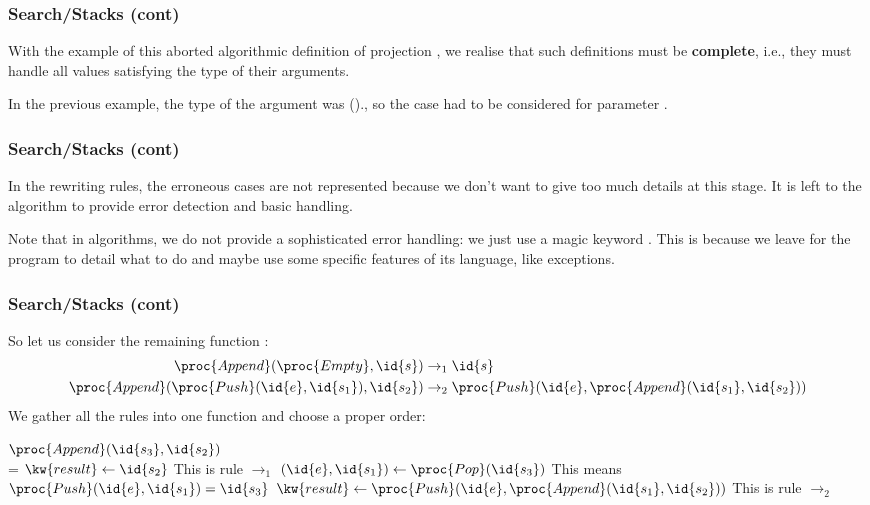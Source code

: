 %
\begin{frame}
\frametitle{Search/Stacks (cont)}

With the example of this aborted algorithmic definition of projection
, we realise that such definitions must be
\textbf{complete}, i.e., they must handle all values satisfying the
type of their arguments.

\bigskip

In the previous example, the type of the argument was
()., so the case  had to be
considered for parameter .

\end{frame}

%
\begin{frame}
\frametitle{Search/Stacks (cont)}


In the rewriting rules, the erroneous cases are not represented
because we don't want to give too much details at this stage. It is
left to the algorithm to provide error detection and basic handling.

\bigskip

Note that in algorithms, we do not provide a sophisticated error
handling: we just use a magic keyword . This is because we
leave for the program to detail what to do and maybe use some
specific features of its language, like exceptions.

\end{frame}

%
\begin{frame}
\frametitle{Search/Stacks (cont)}

So let us consider the remaining function :
\begin{align*}
   \proc{Append} (\proc{Empty}, \id{s}) 
&\rightarrow_1 \id{s}\\
   \proc{Append} (\proc{Push} (\id{e}, \id{s_1}), \id{s_2}) 
&\rightarrow_2 \proc{Push} (\id{e}, \proc{Append} (\id{s_1},
   \id{s_2}))
\end{align*}
We gather all the rules into one function and choose a proper order:
{\small
\begin{codebox}
\(\proc{Append} (\id{s_3}, \id{s_2})\)\\
\zi \If {} = 
\zi \Then \(\kw{result} \gets \id{s_2}\) \RComment This is
rule \(\rightarrow_1\)
\zi	\Else   \((\id{e}, \id{s_1}) \gets \proc{Pop} (\id{s_3})\)
                  \RComment This means \(\proc{Push} (\id{e},
                  \id{s_1}) = \id{s_3}\)
\zi		\(\kw{result} \gets \proc{Push} (\id{e},
                   \proc{Append} (\id{s_1}, \id{s_2}))\) 
                   \RComment This is rule \(\rightarrow_2\)
\zi	\End
\end{codebox}
}

\end{frame}

